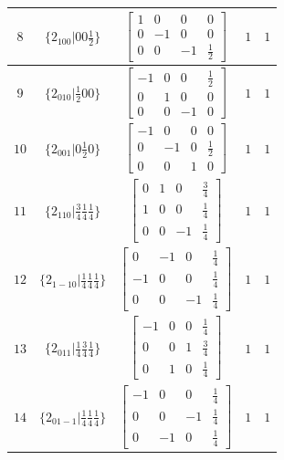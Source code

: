 \documentclass[fleqn,8pt]{jsarticle}
\begin{document}
\begin{longtable}{ccccc}
$ 8 $ & $ \{2{}_{100}|0 0 \frac{1}{2}\} $ & $ \begin{bmatrix} 1 & 0 & 0 & 0 \\ 0 & -1 & 0 & 0 \\ 0 & 0 & -1 & \frac{1}{2} \end{bmatrix} $ & $ 1 $ & $ 1 $ \\ \hline
$ 9 $ & $ \{2{}_{010}|\frac{1}{2} 0 0\} $ & $ \begin{bmatrix} -1 & 0 & 0 & \frac{1}{2} \\ 0 & 1 & 0 & 0 \\ 0 & 0 & -1 & 0 \end{bmatrix} $ & $ 1 $ & $ 1 $ \\ \hline
$ 10 $ & $ \{2{}_{001}|0 \frac{1}{2} 0\} $ & $ \begin{bmatrix} -1 & 0 & 0 & 0 \\ 0 & -1 & 0 & \frac{1}{2} \\ 0 & 0 & 1 & 0 \end{bmatrix} $ & $ 1 $ & $ 1 $ \\ \hline
$ 11 $ & $ \{2{}_{110}|\frac{3}{4} \frac{1}{4} \frac{1}{4}\} $ & $ \begin{bmatrix} 0 & 1 & 0 & \frac{3}{4} \\ 1 & 0 & 0 & \frac{1}{4} \\ 0 & 0 & -1 & \frac{1}{4} \end{bmatrix} $ & $ 1 $ & $ 1 $ \\ \hline
$ 12 $ & $ \{2{}_{1-10}|\frac{1}{4} \frac{1}{4} \frac{1}{4}\} $ & $ \begin{bmatrix} 0 & -1 & 0 & \frac{1}{4} \\ -1 & 0 & 0 & \frac{1}{4} \\ 0 & 0 & -1 & \frac{1}{4} \end{bmatrix} $ & $ 1 $ & $ 1 $ \\ \hline
$ 13 $ & $ \{2{}_{011}|\frac{1}{4} \frac{3}{4} \frac{1}{4}\} $ & $ \begin{bmatrix} -1 & 0 & 0 & \frac{1}{4} \\ 0 & 0 & 1 & \frac{3}{4} \\ 0 & 1 & 0 & \frac{1}{4} \end{bmatrix} $ & $ 1 $ & $ 1 $ \\ \hline
$ 14 $ & $ \{2{}_{01-1}|\frac{1}{4} \frac{1}{4} \frac{1}{4}\} $ & $ \begin{bmatrix} -1 & 0 & 0 & \frac{1}{4} \\ 0 & 0 & -1 & \frac{1}{4} \\ 0 & -1 & 0 & \frac{1}{4} \end{bmatrix} $ & $ 1 $ & $ 1 $ \\ \hline

\end{longtable}
\end{document}
